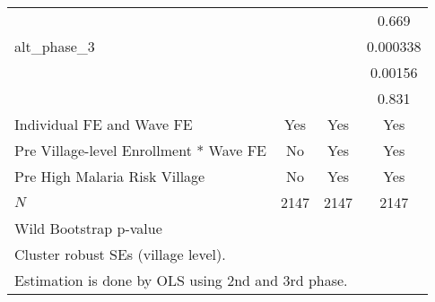 {\begin{tabular}{l*{3}{c}}
            &                     &                     &       0.669         \\
alt\_phase\_3 &                     &                     &    0.000338         \\
            &                     &                     &     0.00156         \\
            &                     &                     &       0.831         \\
Individual FE and Wave FE &         Yes         &         Yes         &         Yes         \\
Pre Village-level Enrollment * Wave FE&          No         &         Yes         &         Yes         \\
Pre High Malaria Risk Village &          No         &         Yes         &         Yes         \\
\hline
\(N\)       &        2147         &        2147         &        2147         \\
Wild Bootstrap p-value &                     &                     &                     \\
\hline\hline
\multicolumn{4}{l}{\footnotesize Cluster robust SEs (village level).}\\
\multicolumn{4}{l}{\footnotesize Estimation is done by OLS using 2nd and 3rd phase.}\\
\end{tabular}
}
